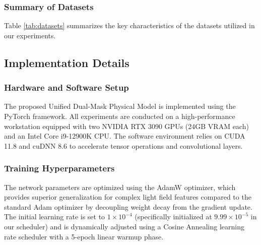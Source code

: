\documentclass[lettersize,journal]{IEEEtran}
\begin{document}
\subsubsection{Summary of Datasets}
Table \ref{tab:datasets} summarizes the key characteristics of the datasets utilized in our experiments.

\begin{table}[!t]
\caption{Summary of Light Field Datasets Used for Training and Evaluation}\label{tab:datasets}
\centering\small
{}
\end{table}

\subsection{Implementation Details}

\subsubsection{Hardware and Software Setup}
The proposed Unified Dual-Mask Physical Model is implemented using the PyTorch framework. All experiments are conducted on a high-performance workstation equipped with two NVIDIA RTX 3090 GPUs (24GB VRAM each) and an Intel Core i9-12900K CPU. The software environment relies on CUDA 11.8 and cuDNN 8.6 to accelerate tensor operations and convolutional layers. 

\subsubsection{Training Hyperparameters}
The network parameters are optimized using the AdamW optimizer, which provides superior generalization for complex light field features compared to the standard Adam optimizer by decoupling weight decay from the gradient update. The initial learning rate is set to $1 \times 10^{-4}$ (specifically initialized at $9.99 \times 10^{-5}$ in our scheduler) and is dynamically adjusted using a Cosine Annealing learning rate scheduler with a 5-epoch linear warmup phase. 
\end{document}
